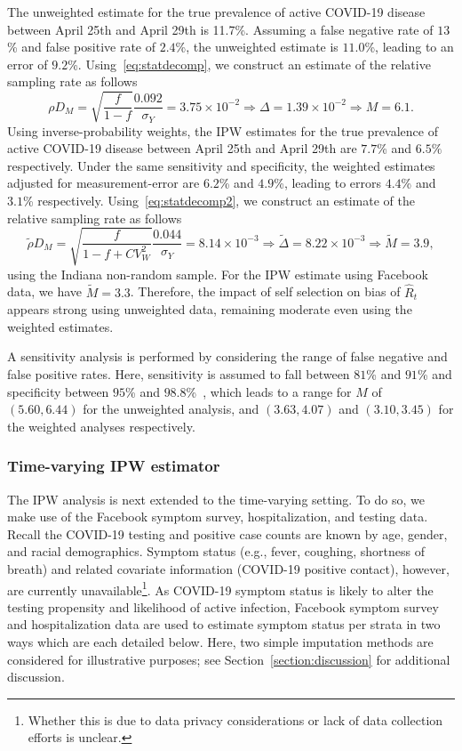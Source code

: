 \documentclass[11pt]{amsart}
\numberwithin{equation}{section}
\theoremstyle{plain}
\begin{document}
The unweighted estimate for the true prevalence of active COVID-19 disease between April 25th and April 29th is 11.7\%.  Assuming a false negative rate of $13$\% and false positive rate of $2.4$\%, the unweighted estimate is $11.0$\%, leading to an error of $9.2$\%.  Using~\eqref{eq:statdecomp}, we construct an estimate of the relative sampling rate as follows
\begin{equation*}
\rho D_M = \sqrt{\frac{f}{1-f}} \frac{\text{0.092}}{\sigma_Y} = 3.75 \times 10^{-2} \Rightarrow \Delta = 1.39 \times 10^{-2} \Rightarrow M = 6.1.
\end{equation*}
Using inverse-probability weights, the IPW estimates for the true prevalence of active COVID-19 disease between April 25th and April 29th are $7.7$\% and $6.5\%$ respectively.  Under the same sensitivity and specificity, the weighted estimates adjusted for measurement-error are $6.2$\% and $4.9$\%, leading to errors $4.4$\% and $3.1$\% respectively.  Using~\eqref{eq:statdecomp2}, we construct an estimate of the relative sampling rate as follows
\begin{equation*}
\tilde \rho D_M = \sqrt{\frac{f}{1-f+CV_W^2}} \frac{\text{0.044}}{\sigma_Y} = 8.14 \times 10^{-3} \Rightarrow \tilde \Delta = 8.22 \times 10^{-3}  \Rightarrow \tilde M = 3.9,
\end{equation*}
using the Indiana non-random sample.  For the IPW estimate using Facebook data, we have $\tilde M = 3.3$. Therefore, the impact of self selection on bias of $\hat R_t$ appears strong using unweighted data, remaining moderate even using the weighted estimates.

A sensitivity analysis is performed by considering the range of false negative and false positive rates.  Here, sensitivity is assumed to fall between $81$\% and $91$\% and specificity between $95$\% and $98.8$\%~\cite{Katz2020}, which leads to a range for $M$ of $(5.60, 6.44)$ for the unweighted analysis, and $(3.63,4.07)$ and $(3.10, 3.45)$ for the weighted analyses respectively.

\subsubsection{Time-varying IPW estimator}

The IPW analysis is next extended to the time-varying setting.  To do so, we make use of the Facebook symptom survey, hospitalization, and testing data.  Recall the COVID-19 testing and positive case counts are known by age, gender, and racial demographics. Symptom status (e.g., fever, coughing, shortness of breath) and related covariate information (COVID-19 positive contact), however, are currently unavailable\footnote{Whether this is due to data privacy considerations or lack of data collection efforts is unclear.}.  As COVID-19 symptom status is likely to alter the testing propensity and likelihood of active infection, Facebook symptom survey and hospitalization data are used to estimate symptom status per strata in two ways which are each detailed below. Here, two simple imputation methods are considered for illustrative purposes; see Section~\ref{section:discussion} for additional discussion.
\end{document}
